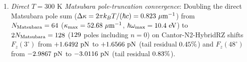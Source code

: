 \documentclass[pdflatex,sn-nature]{sn-jnl}
\DeclareRobustCommand{\roundtwo}[1]{\fpeval{round(#1,2)}}
\DeclareRobustCommand{\roundthree}[1]{\fpeval{round(#1,3)}}
\DeclareRobustCommand{\roundfour}[1]{\fpeval{round(#1,4)}}
\begin{document}
\begin{enumerate}
    \item \emph{Direct $T=300\text{ K}$ Matsubara pole-truncation convergence}: Doubling the direct Matsubara pole sum ($\Delta\kappa = 2\pi k_B T/(\hbar c) = \roundthree{\BemValMatsubaraDeltaKappaPerUm}\ \mu\text{m}^{-1}$) from $N_{\rm Matsubara} = 64{}$ ($\kappa_{\max} = \roundtwo{\BemValMatsubaraKappaCutoffPerUm}\ \mu\text{m}^{-1}$, $\hbar\omega_{\max} = \roundtwo{\BemValMatsubaraEnergyCutoffEv}\text{ eV}$) to $2N_{\rm Matsubara} = 128{}$ ($129{}$ poles including $n=0$) on Cantor-N2-HybridRZ shifts $F_z(3^\circ)$ from $+\roundfour{\BemValMatsubaraCantorThetathreeFNPn}\text{ pN}$ to $+\roundfour{\BemValMatsubaraCantorThetathreeFTwonPn}\text{ pN}$ (tail residual $\roundtwo{\BemValMatsubaraCantorThetathreeTailRelPct}\%$) and $F_z(48^\circ)$ from $\roundfour{\BemValMatsubaraCantorThetafoureightFNPn}\text{ pN}$ to $\roundfour{\BemValMatsubaraCantorThetafoureightFTwonPn}\text{ pN}$ (tail residual $\roundtwo{\BemValMatsubaraCantorThetafoureightTailRelPct}\%$).
\end{enumerate}
\end{document}
